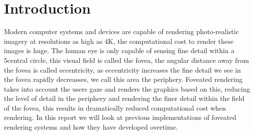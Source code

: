 \section{Introduction}
Modern computer systems and devices are capable of rendering photo-realistic imagery at resolutions as high as 4K, the computational cost to render these images is huge. The human eye is only capable of sensing fine detail within a 5\degree central circle, this visual field is called the fovea, the angular distance away from the fovea is called eccentricity, as eccentricity increases the fine detail we see in the fovea rapidly decreasses, we call this area the periphery. Foveated rendering takes into account the users gaze and renders the graphics based on this, reducing the level of detail in the periphery and rendering the finer detail within the field of the fovea, this results in dramatically reduced computational cost when rendering. In this report we will look at previous implementations of foveated rendering systems and how they have developed overtime.